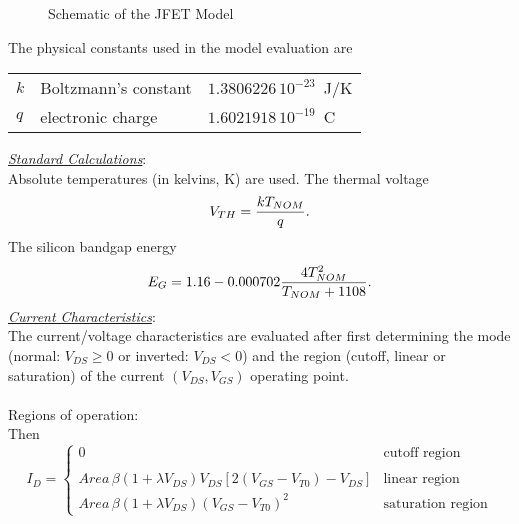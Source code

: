 \begin{figure}[h]
\centerline{\epsfxsize=3.5in} \caption{Schematic
of the JFET Model}
\end{figure}
\newline
The physical constants used in the model evaluation are
\begin{center}
\begin{tabular}{|l|l|l|}
\hline
$k$ & Boltzmann's constant           &  $1.3806226\,10^{-23}$~J/K\\
$q$ & electronic charge             & $1.6021918\,10^{-19}$~C\\
\hline
\end{tabular}
\end{center}
\noindent\textit{\underline{\large Standard Calculations}}:\\[0.1in]
Absolute temperatures (in kelvins, K) are used. The thermal
voltage
\begin{equation}
V_{TH} = {{kT_{NOM}} \over q} .
\end{equation}
\noindent The silicon bandgap energy
\begin{equation}
E_G = 1.16 - 0.000702{{4T_{NOM}^2} \over {T_{NOM}+1108}} .
\end{equation}
\noindent\textit{\underline{\large Current Characteristics}}:\\[0.1in]
The current/voltage characteristics are evaluated after first
determining the mode (normal: $V_{DS} \ge 0$ or inverted: $V_{DS}
< 0$) and the region (cutoff, linear or saturation) of the current
$(V_{DS}, V_{GS})$ operating point.\\[0.1in]

\\[0.2in]
Regions of operation:
\newline
{}\\[0.1in]
Then
\begin{equation}
I_{D} = \left\{ \begin{array}{ll}
      0  & \mbox{cutoff region} \\ \\
      Area\,\beta \left(1 + \lambda V_{DS}\right)V_{DS}
      \left[2\left(V_{GS}-V_{T0}\right)-V_{DS}\right]
         &\mbox{linear region}\\
      Area\,\beta \left(1 + \lambda V_{DS}\right)
      \left(V_{GS}-V_{T0}\right)^2
         &\mbox{saturation region} \end{array} \right. %
\end{equation}


